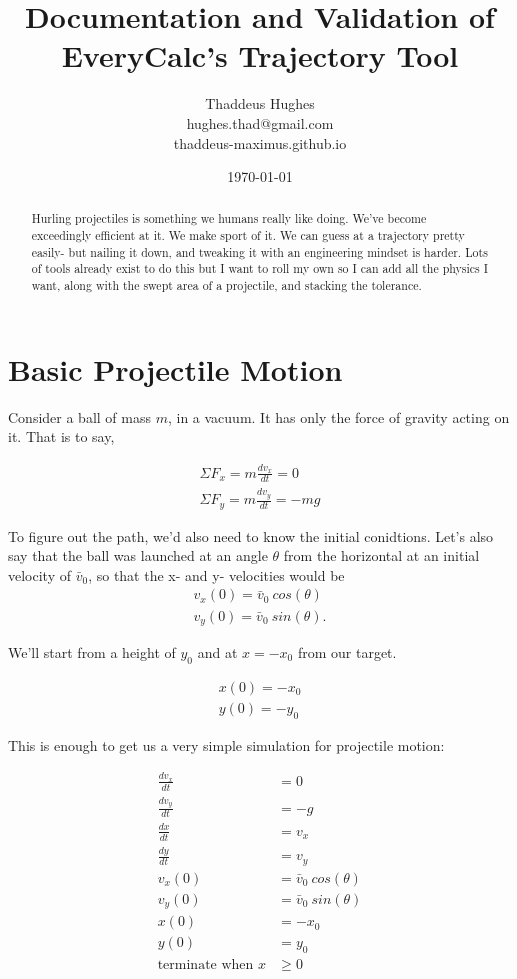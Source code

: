 \documentclass[10pt,letterpaper]{article}
\author{Thaddeus Hughes \\ hughes.thad@gmail.com \\ thaddeus-maximus.github.io}
\date{\today}
\title{Documentation and Validation of EveryCalc's Trajectory Tool}
\begin{document}
	\maketitle
	
	\begin{abstract}
		Hurling projectiles is something we humans really like doing. We've become exceedingly efficient at it. We make sport of it. We can guess at a trajectory pretty easily- but nailing it down, and tweaking it with an engineering mindset is harder. Lots of tools already exist to do this but I want to roll my own so I can add all the physics I want, along with the swept area of a projectile, and stacking the tolerance.
	\end{abstract}
	
\section*{Basic Projectile Motion}
	Consider a ball of mass $m$, in a vacuum. It has only the force of gravity acting on it. That is to say,

	\begin{align}
		\Sigma F_x = m \frac{d v_x}{d t} = 0 \\
		\Sigma F_y = m \frac{d v_y}{d t} = - m g
	\end{align}

	To figure out the path, we'd also need to know the initial conidtions. Let's also say that the ball was launched at an angle $\theta$ from the horizontal at an initial velocity of $\bar{v}_0$, so that the x- and y- velocities would be
	\begin{align}
		v_x(0) = \bar{v}_0 \ cos(\theta) \\
		v_y(0) = \bar{v}_0 \ sin(\theta) .
	\end{align}

	We'll start from a height of $y_0$ and at $x=-x_0$ from our target.

	\begin{align}
		x(0) = -x_0 \\
		y(0) = -y_0 
	\end{align}

	This is enough to get us a very simple simulation for projectile motion:

	\begin{align}
		\frac{d v_x}{d t} &= 0 \\
		\frac{d v_y}{d t} &= - g \\
		\frac{d x}{d t} &= v_x \\
		\frac{d y}{d t} &= v_y \\
		v_x(0) &= \bar{v}_0 \ cos(\theta) \\
		v_y(0) &= \bar{v}_0 \ sin(\theta) \\
		x(0) &= -x_0 \\
		y(0) &= y_0 \\
		\text{terminate when } x &\geq 0
	\end{align}
\end{document}

